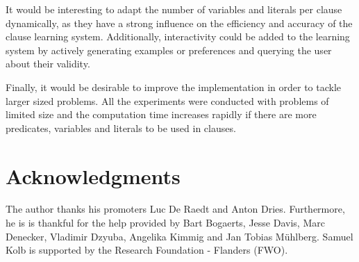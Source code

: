 \documentclass[letterpaper]{article}
\theoremstyle{definition}
\begin{document}
It would be interesting to adapt the number of variables and literals per clause dynamically, as they have a strong influence on the efficiency and accuracy of the clause learning system.
Additionally, interactivity could be added to the learning system by actively generating examples or preferences and querying the user about their validity.

Finally, it would be desirable to improve the implementation in order to tackle larger sized problems.
All the experiments were conducted with problems of limited size and the computation time increases rapidly if there are more predicates, variables and literals to be used in clauses.

\section*{Acknowledgments}
The author thanks his promoters Luc De Raedt and Anton Dries.
Furthermore, he is is thankful for the help provided by Bart Bogaerts, Jesse Davis, Marc Denecker, Vladimir Dzyuba, Angelika Kimmig and Jan Tobias M\"uhlberg.
Samuel Kolb is supported by the Research Foundation - Flanders (FWO).

\newpage




\end{document}
